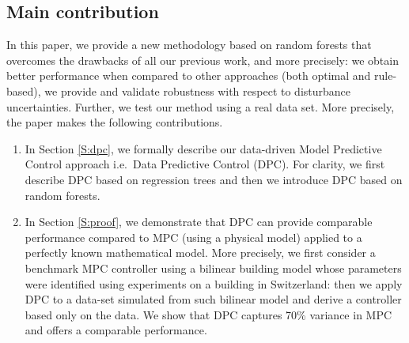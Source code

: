 \textcolor[rgb]{0,0,1}{
\subsection{Main contribution}
In this paper, we provide a new methodology based on random forests that overcomes the drawbacks of all our previous work, and more precisely: we obtain better performance when compared to other approaches (both optimal and rule-based), we provide and validate robustness with respect to disturbance uncertainties.
Further, we test our method using a real data set. 
More precisely, the paper makes the following contributions.
\begin{enumerate}
	\item In Section \ref{S:dpc}, we formally describe our data-driven Model Predictive Control approach i.e.~Data Predictive Control (DPC). For clarity, we first describe DPC based on regression trees and then we introduce DPC based on random forests.
	\item In Section \ref{S:proof}, we demonstrate that DPC can provide comparable performance compared to MPC (using a physical model) applied to a perfectly known mathematical model. More precisely, we first consider a benchmark MPC controller using a bilinear building model whose parameters were identified using experiments on a building in Switzerland: then we apply DPC to a data-set simulated from such bilinear model and derive a controller based only on the data. We show that DPC captures 70\% variance in MPC and offers a comparable performance.

\end{enumerate}}

